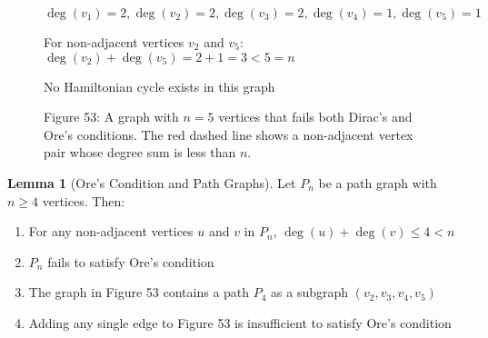 \documentclass{article}
\theoremstyle{definition}
\newtheorem{lemma}{Lemma}
\begin{document}
\begin{figure}[h!]
\begin{center}
\end{center}

\vspace{0.5cm}
{\centering
\small $\deg(v_1) = 2, \deg(v_2) = 2, \deg(v_3) = 2, \deg(v_4) = 1, \deg(v_5) = 1$
\par}

\vspace{0.3cm}
{\centering
\small For non-adjacent vertices $v_2$ and $v_5$: $\deg(v_2) + \deg(v_5) = 2 + 1 = 3 < 5 = n$
\par}

\vspace{0.3cm}
{\centering
\small No Hamiltonian cycle exists in this graph
\par}

\begin{center}
\small Figure 53: A graph with $n = 5$ vertices that fails both Dirac's and Ore's conditions. The red dashed line shows a non-adjacent vertex pair whose degree sum is less than $n$.
\end{center}
\end{figure}
\begin{lemma}[Ore's Condition and Path Graphs]
Let $P_n$ be a path graph with $n \geq 4$ vertices. Then:
\begin{enumerate}
    \item For any non-adjacent vertices $u$ and $v$ in $P_n$, $\deg(u) + \deg(v) \leq 4 < n$
    \item $P_n$ fails to satisfy Ore's condition
    \item The graph in Figure 53 contains a path $P_4$ as a subgraph $(v_2, v_3, v_4, v_5)$
    \item Adding any single edge to Figure 53 is insufficient to satisfy Ore's condition
\end{enumerate}
\end{lemma}
\end{document}

